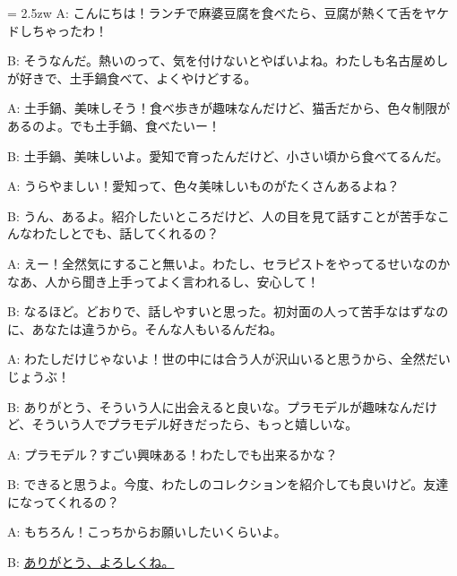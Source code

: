 \documentclass[11pt]{amsart}
\title{}
\author{}
\newenvironment{hangall}[1]{\hangindent = 2.5zw\everypar{\hangindent = 2.5zw}}{}
\begin{document}
\maketitle
\begin{hangall}{}%
A: こんにちは！ランチで麻婆豆腐を食べたら、豆腐が熱くて舌をヤケドしちゃったわ！

B: そうなんだ。熱いのって、気を付けないとやばいよね。わたしも名古屋めしが好きで、土手鍋食べて、よくやけどする。

A: 土手鍋、美味しそう！食べ歩きが趣味なんだけど、猫舌だから、色々制限があるのよ。でも土手鍋、食べたいー！

B: 土手鍋、美味しいよ。愛知で育ったんだけど、小さい頃から食べてるんだ。

A: うらやましい！愛知って、色々美味しいものがたくさんあるよね？

B: うん、あるよ。紹介したいところだけど、人の目を見て話すことが苦手なこんなわたしとでも、話してくれるの？

A: えー！全然気にすること無いよ。わたし、セラピストをやってるせいなのかなあ、人から聞き上手ってよく言われるし、安心して！

B: なるほど。どおりで、話しやすいと思った。初対面の人って苦手なはずなのに、あなたは違うから。そんな人もいるんだね。

A: わたしだけじゃないよ！世の中には合う人が沢山いると思うから、全然だいじょうぶ！

B: ありがとう、そういう人に出会えると良いな。プラモデルが趣味なんだけど、そういう人でプラモデル好きだったら、もっと嬉しいな。

A: プラモデル？すごい興味ある！わたしでも出来るかな？

B: できると思うよ。今度、わたしのコレクションを紹介しても良いけど。友達になってくれるの？

A: もちろん！こっちからお願いしたいくらいよ。

B: \ul{ありがとう、よろしくね。}\end{hangall}
\end{document}
